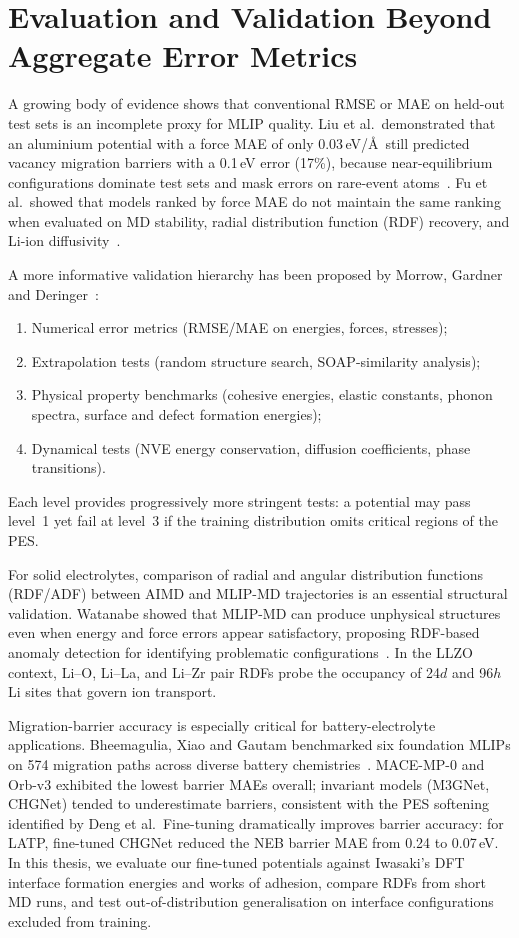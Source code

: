 \documentclass[12pt,a4paper,oneside]{book}
\begin{document}
\section{Evaluation and Validation Beyond Aggregate Error Metrics}
\label{sec:evaluation}

A growing body of evidence shows that conventional RMSE or MAE on held-out test sets is an incomplete proxy for MLIP quality. Liu et al.\ demonstrated that an aluminium potential with a force MAE of only 0.03\,eV/\AA\ still predicted vacancy migration barriers with a 0.1\,eV error (17\%), because near-equilibrium configurations dominate test sets and mask errors on rare-event atoms~\cite{Liu2023}. Fu et al.\ showed that models ranked by force MAE do not maintain the same ranking when evaluated on MD stability, radial distribution function (RDF) recovery, and Li-ion diffusivity~\cite{Fu2023}.

A more informative validation hierarchy has been proposed by Morrow, Gardner and Deringer~\cite{Morrow2023}:
\begin{enumerate}
  \item Numerical error metrics (RMSE/MAE on energies, forces, stresses);
  \item Extrapolation tests (random structure search, SOAP-similarity analysis);
  \item Physical property benchmarks (cohesive energies, elastic constants, phonon spectra, surface and defect formation energies);
  \item Dynamical tests (NVE energy conservation, diffusion coefficients, phase transitions).
\end{enumerate}
Each level provides progressively more stringent tests: a potential may pass level~1 yet fail at level~3 if the training distribution omits critical regions of the PES.

For solid electrolytes, comparison of radial and angular distribution functions (RDF/ADF) between AIMD and MLIP-MD trajectories is an essential structural validation. Watanabe showed that MLIP-MD can produce unphysical structures even when energy and force errors appear satisfactory, proposing RDF-based anomaly detection for identifying problematic configurations~\cite{Watanabe2024}. In the LLZO context, Li--O, Li--La, and Li--Zr pair RDFs probe the occupancy of 24$d$ and 96$h$ Li sites that govern ion transport.

Migration-barrier accuracy is especially critical for battery-electrolyte applications. Bheemagulia, Xiao and Gautam benchmarked six foundation MLIPs on 574 migration paths across diverse battery chemistries~\cite{Bheemagulia2026}. MACE-MP-0 and Orb-v3 exhibited the lowest barrier MAEs overall; invariant models (M3GNet, CHGNet) tended to underestimate barriers, consistent with the PES softening identified by Deng et al.\ Fine-tuning dramatically improves barrier accuracy: for LATP, fine-tuned CHGNet reduced the NEB barrier MAE from 0.24 to 0.07\,eV. In this thesis, we evaluate our fine-tuned potentials against Iwasaki's DFT interface formation energies and works of adhesion, compare RDFs from short MD runs, and test out-of-distribution generalisation on interface configurations excluded from training.
\end{document}
